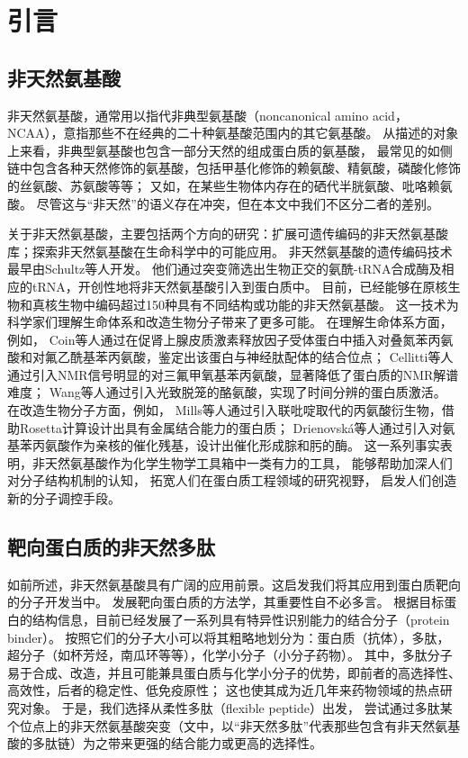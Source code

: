 
\chapter{引言}



\section{非天然氨基酸}

非天然氨基酸，通常用以指代非典型氨基酸（noncanonical amino acid，NCAA），意指那些不在经典的二十种氨基酸范围内的其它氨基酸。
从描述的对象上来看，非典型氨基酸也包含一部分天然的组成蛋白质的氨基酸，
最常见的如侧链中包含各种天然修饰的氨基酸，包括甲基化修饰的赖氨酸、精氨酸，磷酸化修饰的丝氨酸、苏氨酸等等；
又如，在某些生物体内存在的硒代半胱氨酸、吡咯赖氨酸\cite{RN116}。
尽管这与“非天然”的语义存在冲突，但在本文中我们不区分二者的差别。

关于非天然氨基酸，主要包括两个方向的研究：扩展可遗传编码的非天然氨基酸库；探索非天然氨基酸在生命科学中的可能应用。
非天然氨基酸的遗传编码技术最早由Schultz等人\cite{RN81}开发。
他们通过突变筛选出生物正交的氨酰-tRNA合成酶及相应的tRNA，开创性地将非天然氨基酸引入到蛋白质中\cite{RN82}。
目前，已经能够在原核生物和真核生物中编码超过150种具有不同结构或功能的非天然氨基酸\cite{RN79}。
这一技术为科学家们理解生命体系和改造生物分子带来了更多可能。
在理解生命体系方面，例如，
Coin等人\cite{RN83}通过在促肾上腺皮质激素释放因子受体蛋白中插入对叠氮苯丙氨酸和对氟乙酰基苯丙氨酸，鉴定出该蛋白与神经肽配体的结合位点；
Cellitti等人\cite{RN84}通过引入NMR信号明显的对三氟甲氧基苯丙氨酸，显著降低了蛋白质的NMR解谱难度；
Wang等人\cite{RN85}通过引入光致脱笼的酪氨酸，实现了时间分辨的蛋白质激活。
在改造生物分子方面，例如，
Mills等人\cite{RN41}通过引入联吡啶取代的丙氨酸衍生物，借助Rosetta计算设计出具有金属结合能力的蛋白质；
Drienovská等人\cite{RN86}通过引入对氨基苯丙氨酸作为亲核的催化残基，设计出催化形成腙和肟的酶。
这一系列事实表明，非天然氨基酸作为化学生物学工具箱中一类有力的工具，
能够帮助加深人们对分子结构机制的认知，
拓宽人们在蛋白质工程领域的研究视野，
启发人们创造新的分子调控手段。



\section{靶向蛋白质的非天然多肽}

如前所述，非天然氨基酸具有广阔的应用前景。这启发我们将其应用到蛋白质靶向的分子开发当中。
发展靶向蛋白质的方法学，其重要性自不必多言。
根据目标蛋白的结构信息，目前已经发展了一系列具有特异性识别能力的结合分子（protein binder）。
按照它们的分子大小可以将其粗略地划分为：蛋白质（抗体），多肽，超分子（如杯芳烃，南瓜环等等）\cite{RN88}，化学小分子（小分子药物）。
其中，多肽分子易于合成、改造，并且可能兼具蛋白质与化学小分子的优势，即前者的高选择性、高效性，后者的稳定性、低免疫原性\cite{RN89}；
这也使其成为近几年来药物领域的热点研究对象\cite{RN90}。
于是，我们选择从柔性多肽（flexible peptide）出发，
尝试通过多肽某个位点上的非天然氨基酸突变（文中，以“非天然多肽”代表那些包含有非天然氨基酸的多肽链）为之带来更强的结合能力或更高的选择性。


